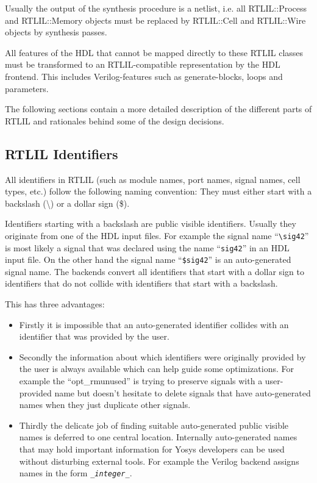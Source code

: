 \begin{sloppypar}
Usually the output of the synthesis procedure is a netlist, i.e. all
RTLIL::Process and RTLIL::Memory objects must be replaced by RTLIL::Cell and
RTLIL::Wire objects by synthesis passes.
\end{sloppypar}

All features of the HDL that cannot be mapped directly to these RTLIL classes must be
transformed to an RTLIL-compatible representation by the HDL frontend. This includes
Verilog-features such as generate-blocks, loops and parameters.

The following sections contain a more detailed description of the different
parts of RTLIL and rationales behind some of the design decisions.

\subsection{RTLIL Identifiers}

All identifiers in RTLIL (such as module names, port names, signal names, cell
types, etc.) follow the following naming convention: They must either start with
a backslash (\textbackslash) or a dollar sign (\$).

Identifiers starting with a backslash are public visible identifiers. Usually
they originate from one of the HDL input files. For example the signal name ``{\tt \textbackslash sig42}''
is most likely a signal that was declared using the name ``{\tt sig42}'' in an HDL input file.
On the other hand the signal name ``{\tt \$sig42}'' is an auto-generated signal name. The backends
convert all identifiers that start with a dollar sign to identifiers that do not collide with
identifiers that start with a backslash.

This has three advantages:

\begin{itemize}
\item Firstly it is impossible that an auto-generated identifier collides with
an identifier that was provided by the user.
\item Secondly the information about which identifiers were originally
provided by the user is always available which can help guide some optimizations. For example the ``opt\_rmunused''
is trying to preserve signals with a user-provided name but doesn't hesitate to delete signals that have
auto-generated names when they just duplicate other signals.
\item Thirdly the delicate job of finding suitable auto-generated public visible
names is deferred to one central location. Internally auto-generated names that
may hold important information for Yosys developers can be used without
disturbing external tools. For example the Verilog backend assigns names in the form {\tt \_{\it integer}\_}.
\end{itemize}

